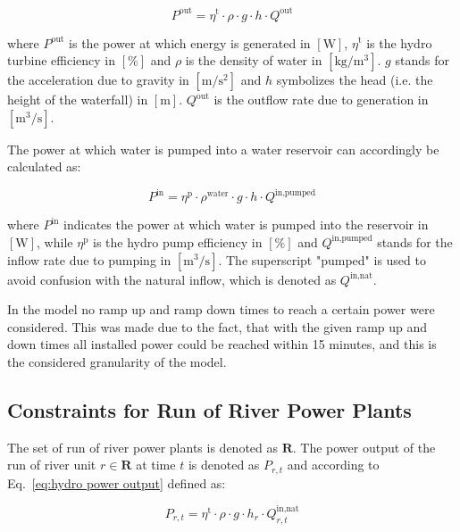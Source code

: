 \begin{equation}\label{eq:hydro power output}
    P^{\text{out}} = \eta^{\text{t}} \cdot \rho \cdot g \cdot h \cdot Q^{\text{out}}
\end{equation}

\noindent where $P^{\text{out}}$ is the power at which energy is generated in $[\si{\W}]$, 
$\eta^{\text{t}}$ is the hydro turbine efficiency in $[\%]$ and $\rho$ is the density of water in $[\si{\kg\per\cubic\metre}]$. $g$ stands for the acceleration due to gravity in $[\si{\metre\per\square\second}]$ and $h$ symbolizes the head (i.e. the height of the waterfall) in $[\si{\metre}]$. $Q^{\text{out}}$ is the outflow rate due to generation in $[\si{\cubic\metre\per\second}]$.

The power at which water is pumped into a water reservoir can accordingly be calculated as: 

\begin{equation}\label{eq:hydro power input}
    P^{\text{in}} = \eta^{\text{p}} \cdot \rho^{\text{water}} \cdot g \cdot h \cdot Q^{\text{in,pumped}}
\end{equation}

\noindent where $P^{\text{in}}$ indicates the power at which water is pumped into the reservoir in $[\si{\W}]$, while $\eta^{\text{p}}$ is the hydro pump efficiency in $[\%]$ and $Q^{\text{in,pumped}}$ stands for the inflow rate due to pumping in $[\si{\cubic\metre\per\second}]$. The superscript "pumped" is used to avoid confusion with the natural inflow, which is denoted as $Q^{\text{in,nat}}$.

In the model no ramp up and ramp down times to reach a certain power were considered. This was made due to the fact, that with the given ramp up and down times all installed power could be reached within 15 minutes, and this is the considered granularity of the model. 

\subsection{Constraints for Run of River Power Plants}
The set of run of river power plants is denoted as $\textbf{R}$. The power output of the run of river unit $r \in \textbf{R}$ at time $t$ is denoted as $P_{r, t}$ and according to Eq.~\eqref{eq:hydro power output} defined as:

\begin{equation}\label{const:ror power output}
    P_{r, t} = \eta^{\text{t}} \cdot \rho \cdot g \cdot h_{r} \cdot Q^{\text{in,nat}}_{r, t}
\end{equation}

